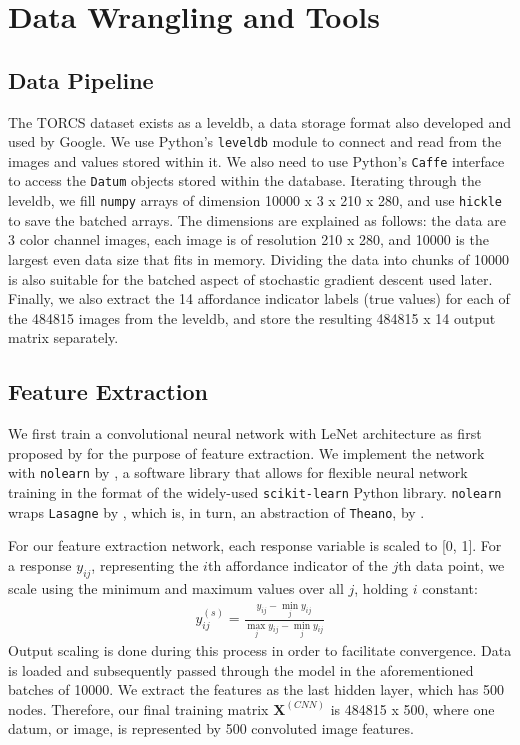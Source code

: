\documentclass[master]{subfiles}
\begin{document}
\section{Data Wrangling and Tools}\label{sec:data_tools}
\subsection{Data Pipeline}
The TORCS dataset exists as a leveldb, a data storage format also developed and used by Google.  We use Python's \lstinline{leveldb} module to connect and read from the images and values stored within it.  We also need to use Python's \lstinline{Caffe} interface to access the \lstinline{Datum} objects stored within the database.  Iterating through the leveldb, we fill \lstinline{numpy} arrays of dimension 10000 x 3 x 210 x 280, and use \lstinline{hickle} to save the batched arrays.  The dimensions are explained as follows: the data are 3 color channel images, each image is of resolution 210 x 280, and 10000 is the largest even data size that fits in memory.  Dividing the data into chunks of 10000 is also suitable for the batched aspect of stochastic gradient descent used later.  Finally, we also extract the 14 affordance indicator labels (true values) for each of the 484815 images from the leveldb, and store the resulting 484815 x 14 output matrix separately.
\subsection{Feature Extraction}
We first train a convolutional neural network with LeNet architecture as first proposed by \cite{lenet} for the purpose of feature extraction.  We implement the network with \lstinline{nolearn} by \cite{nolearn}, a software library that allows for flexible neural network training in the format of the widely-used \lstinline{scikit-learn} Python library.  \lstinline{nolearn} wraps \lstinline{Lasagne} by \cite{lasagne}, which is, in turn, an abstraction of \lstinline{Theano}, by \cite{theano}.\par
For our feature extraction network, each response variable is scaled to [0, 1].  For a response $y_{ij}$, representing the $i$th affordance indicator of the $j$th data point, we scale using the minimum and maximum values over all $j$, holding $i$ constant:
\begin{align*}
y_{ij}^{(s)} = \frac{y_{ij} - \min_jy_{ij}}{\max_jy_{ij} - \min_jy_{ij}}
\end{align*}
Output scaling is done during this process in order to facilitate convergence.  Data is loaded and subsequently passed through the model in the aforementioned batches of 10000.  We extract the features as the last hidden layer, which has 500 nodes.  Therefore, our final training matrix $\mathbf{X}^{(CNN)}$ is 484815 x 500, where one datum, or image, is represented by 500 convoluted image features.
\end{document}
